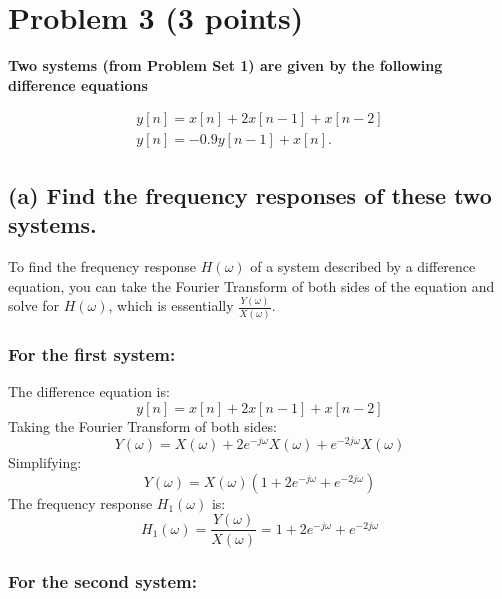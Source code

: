 \section{Problem 3 (3 points)}
\textbf{Two systems (from Problem Set 1) are given by the following difference
equations}

\begin{equation*}
    \begin{array}{l}y[n]=x[n]+2 x[n-1]+x[n-2] \\ y[n]=-0.9 y[n-1]+x[n] .\end{array} 
\end{equation*}

\subsection*{(a) Find the frequency responses of these two systems.}

To find the frequency response $ H(\omega) $ of a system described by a difference equation, you can take the Fourier Transform of both sides of the equation and solve for $ H(\omega) $, which is essentially $ \frac{Y(\omega)}{X(\omega)} $.

\subsubsection*{For the first system:}

The difference equation is:
\begin{equation*}
y[n] = x[n] + 2x[n-1] + x[n-2]
\end{equation*}
Taking the Fourier Transform of both sides:
\begin{equation*}
Y(\omega) = X(\omega) + 2e^{-j\omega}X(\omega) + e^{-2j\omega}X(\omega)
\end{equation*}
Simplifying:
\begin{equation*}
Y(\omega) = X(\omega)(1 + 2e^{-j\omega} + e^{-2j\omega})
\end{equation*}
The frequency response $ H_1(\omega) $ is:
\begin{equation*}
H_1(\omega) = \frac{Y(\omega)}{X(\omega)} = 1 + 2e^{-j\omega} + e^{-2j\omega}
\end{equation*}

\subsubsection*{For the second system:}

